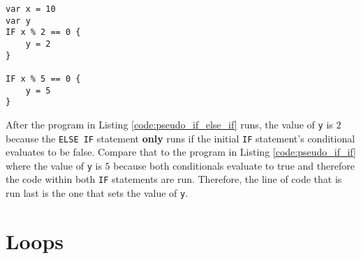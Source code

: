 \documentclass{article}
\begin{document}
\begin{lstlisting}[caption={IF IF.}, label={code:pseudo_if_if}]
var x = 10
var y
IF x % 2 == 0 {
    y = 2
} 

IF x % 5 == 0 {
    y = 5
}
\end{lstlisting}
After the program in Listing \ref{code:pseudo_if_else_if} runs, the value of \lstinline{y} is $2$ because the \lstinline{ELSE IF} statement \textbf{only} runs if the initial \lstinline{IF} statement's conditional evaluates to be false.
Compare that to the program in Listing \ref{code:pseudo_if_if} where the value of \lstinline{y} is $5$ because both conditionals evaluate to true and therefore the code within both \lstinline{IF} statements are run.
Therefore, the line of code that is run last is the one that sets the value of \lstinline{y}.

\section{Loops}
\end{document}
